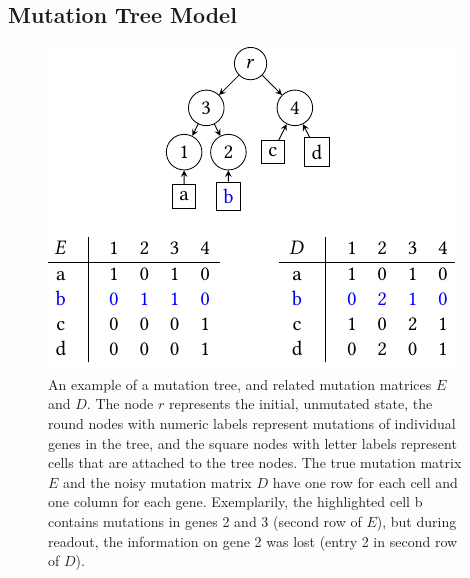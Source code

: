 \subsection{Mutation Tree Model}

\begin{figure}[tbh]
    \includegraphics{figures/mutation_tree.pdf}

    \caption{An example of a mutation tree, and related mutation matrices $E$ and $D$. The node $r$ represents the initial, unmutated state, the round nodes with numeric labels represent mutations of individual genes in the tree, and the square nodes with letter labels represent cells that are attached to the tree nodes. The true mutation matrix $E$ and the noisy mutation matrix $D$ have one row for each cell and one column for each gene. Exemplarily, the highlighted cell \textcolor{emph}{b} contains mutations in genes 2 and 3 (second row of $E$), but during readout, the information on gene 2 was lost (entry 2 in second row of $D$).}
    \label{fig:mutation_tree}
\end{figure}

